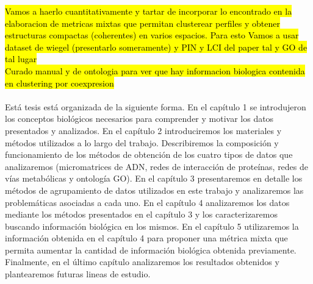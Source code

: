 \hl{Vamos a haerlo cuantitativamente y tartar de incorporar lo encontrado en la elaboracion de metricas mixtas que permitan clusterear perfiles y obtener estructuras compactas (coherentes) en varios espacios. Para esto Vamos a usar dataset de wiegel (presentarlo someramente) y PIN y LCI del paper tal y GO de tal lugar}\\
\hl{Curado manual y de ontologia para ver que hay informacion biologica contenida en clustering por coexpresion}\\\\
Está tesis está organizada de la siguiente forma. En el capítulo 1 se introdujeron los conceptos biológicos necesarios para comprender y motivar los datos presentados y analizados. En el capítulo 2 introduciremos los materiales y métodos utilizados a lo largo del trabajo. Describiremos la composición y funcionamiento de los métodos de obtención de los cuatro tipos de datos que analizaremos (micromatrices de ADN, redes de interacción de proteínas, redes de vías metabólicas y ontología GO). En el capítulo 3 presentaremos en detalle los métodos de agrupamiento de datos utilizados en este trabajo y analizaremos las problemáticas asociadas a cada uno. En el capítulo 4 analizaremos los datos mediante los métodos presentados en el capítulo 3 y los caracterizaremos buscando información biológica en los mismos. En el capítulo 5 utilizaremos la información obtenida en el capítulo 4 para proponer una métrica mixta que permita aumentar la cantidad de información biológica obtenida previamente. Finalmente, en el último capítulo analizaremos los resultados obtenidos y plantearemos futuras lineas de estudio.